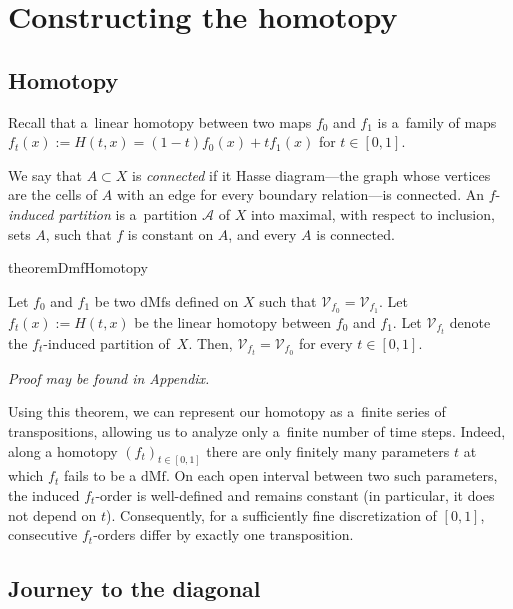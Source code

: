 \documentclass[a4paper,12pt, USenglish,cleveref,autoref,thm-restate]{article}
\newcommand{\proofappendix}{\textit{\small Proof may be found in Appendix.}}
\newcommand{\dmf}{\text{dMf}}
\newcommand{\cx}{x}
\newcommand{\cV}{\mathcal{V}}
\newcommand{\cA}{\mathcal{A}}
\begin{document}
\section{Constructing the homotopy}

\subsection{Homotopy}\label{sec:homotopy}
Recall that a~linear homotopy between two maps $f_0$ and $f_1$ is a~family of maps $f_t(x):=H(t,x) = (1-t)f_0(x) + tf_1(x)$ for $t \in [0,1]$.

\noindent We say that $A \subset X$ is \emph{connected} if it Hasse diagram---the graph whose vertices are the cells of $A$ with an edge for every boundary relation---is connected.
An $f$-\emph{induced partition} is a~partition $\cA$ of $X$ into maximal, with respect to inclusion, sets $A$, such that $f$ is constant on $A$, and every $A$ is connected.



\begin{restatable}{theorem}{DmfHomotopy}\label{thm:dmf-homotopy}

 
    Let $f_0$ and $f_1$ be two $\dmf$s defined on $X$ such that $\cV_{f_0} = \cV_{f_1}$.
    Let $f_t(\cx) := H(t,\cx)$ be the linear homotopy between $f_0$ and $f_1$.
    Let $\cV_{f_t}$ denote the $f_t$-induced partition of~$X$.
    Then, $\cV_{f_t} = \cV_{f_0}$  
       for every $t\in[0,1]$. 

\end{restatable}

\proofappendix

\noindent Using this theorem, we can represent our homotopy as a~finite series of transpositions, allowing us to analyze only a~finite number of time steps.
Indeed, along a homotopy $(f_t)_{t\in[0,1]}$ there are only finitely many parameters $t$ at which $f_t$ fails to be a $\dmf$.
On each open interval between two such parameters, the induced $f_t$-order is well-defined and remains constant (in particular, it does not depend on $t$).
Consequently, for a sufficiently fine discretization of $[0,1]$, consecutive $f_t$-orders differ by exactly one transposition.




\subsection{Journey to the diagonal}\label{sec:evade}
\end{document}
